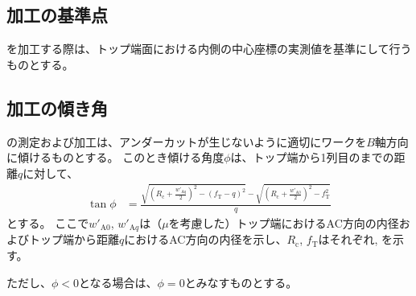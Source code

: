 \subsection{\Dimple 加工の基準点}
\Dimple を加工する際は、トップ端面における内側の中心座標の実測値を基準にして行うものとする。


\subsection{\Dimple 加工の傾き角}
\Dimple の測定および加工は、アンダーカットが生じないように適切にワークを$B$軸方向に傾けるものとする。
このとき傾ける角度$\phi$は、トップ端から1列目の\nameDimple までの距離$q$に対して、
\begin{align*}
  \tan\phi
  &= \frac{\displaystyle
           \sqrt{\left(R_\mathrm c+\frac{w'_{\mathrm Aq}}2\right)^2-(f_\mathrm T-q)^2}
           -\sqrt{\left(R_\mathrm c+\frac{w'_{\mathrm A0}}2\right)^2-f_\mathrm T^2}}q
\end{align*}
とする。
ここで$w'_{\mathrm A0}$, $w'_{\mathrm Aq}$は（\PlatingThk$\mu$を考慮した）トップ端におけるAC方向の内径およびトップ端から距離$q$におけるAC方向の内径を示し、$R_\mathrm c$, $f_\mathrm T$はそれぞれ\CenterCurvatureRadius, \TopAlocationLength を示す。

ただし、$\phi < 0$となる場合は、$\phi = 0$とみなすものとする。


